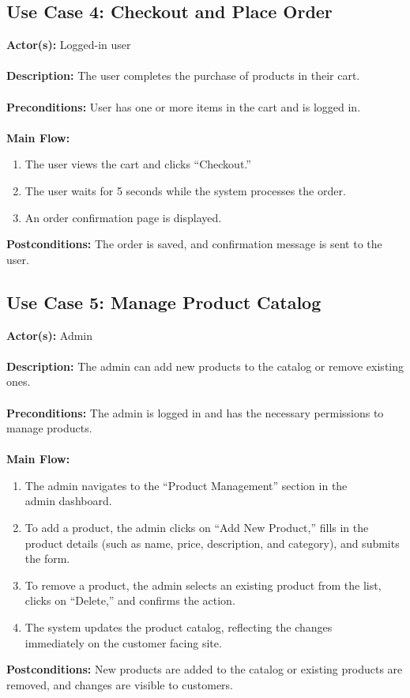\documentclass[a4paper,12pt]{article}
\begin{document}
	\subsection*{Use Case 4: Checkout and Place Order}
	\textbf{Actor(s):} Logged-in user \\ \\
	\textbf{Description:} The user completes the purchase of products in their cart. \\ \\
	\textbf{Preconditions:} User has one or more items in the cart and is logged in. \\ \\
	\textbf{Main Flow:}
	\begin{enumerate}
  		\item The user views the cart and clicks ``Checkout.''
  		\item The user waits for 5 seconds while the system processes the order.
  		\item An order confirmation page is displayed.
	\end{enumerate}
	\textbf{Postconditions:} The order is saved, and confirmation message is sent to the user.




	\subsection*{Use Case 5: Manage Product Catalog}
	\textbf{Actor(s):} Admin \\ \\
	\textbf{Description:} The admin can add new products to the catalog or remove existing ones. \\ \\			\textbf{Preconditions:} The admin is logged in and has the necessary permissions to manage products.
	\\ \\
	\textbf{Main Flow:}
	\begin{enumerate}
  	\item The admin navigates to the ``Product Management'' section in the \\ admin dashboard.
  	\item To add a product, the admin clicks on ``Add New Product,'' fills in the product details (such
  	as name, price, description, and category), and submits the form.
  	\item To remove a product, the admin selects an existing product from the list, clicks on
  	``Delete,'' and confirms the action.
  	\item The system updates the product catalog, reflecting the changes \\ immediately on the customer
  	facing site.
	\end{enumerate}
	\textbf{Postconditions:} New products are added to the catalog or existing products are removed, and
	changes are visible to customers.
\end{document}
